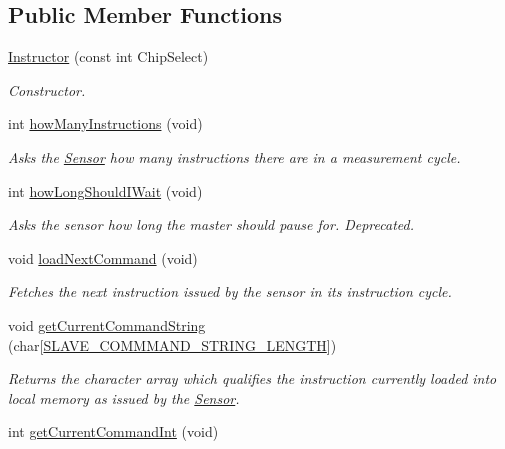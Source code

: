 \subsection*{Public Member Functions}
\begin{DoxyCompactItemize}
\item 
\mbox{\hyperlink{class_instructor_afd38d621d3d07ecb0e9c7f522a1b1823}{Instructor}} (const int Chip\+Select)
\begin{DoxyCompactList}\small\item\em Constructor. \end{DoxyCompactList}\item 
int \mbox{\hyperlink{class_instructor_abfe73e27d6364bf5cad80f30f6833ec8}{how\+Many\+Instructions}} (void)
\begin{DoxyCompactList}\small\item\em Asks the \mbox{\hyperlink{class_sensor}{Sensor}} how many instructions there are in a measurement cycle. \end{DoxyCompactList}\item 
int \mbox{\hyperlink{class_instructor_a2e9afbb8e6ce1c671e8e9dc29cf4715f}{how\+Long\+Should\+I\+Wait}} (void)
\begin{DoxyCompactList}\small\item\em Asks the sensor how long the master should pause for. Deprecated. \end{DoxyCompactList}\item 
void \mbox{\hyperlink{class_instructor_a43cbe18547a30108219f3aa2945fc9ca}{load\+Next\+Command}} (void)
\begin{DoxyCompactList}\small\item\em Fetches the next instruction issued by the sensor in its instruction cycle. \end{DoxyCompactList}\item 
void \mbox{\hyperlink{class_instructor_a8c66f480a7b5a6b434f613bc7197e824}{get\+Current\+Command\+String}} (char\mbox{[}\mbox{\hyperlink{_s_p_i___instruction_set_8h_afb2f23f8980c03317ec47ce151335ec7}{S\+L\+A\+V\+E\+\_\+\+C\+O\+M\+M\+M\+A\+N\+D\+\_\+\+S\+T\+R\+I\+N\+G\+\_\+\+L\+E\+N\+G\+TH}}\mbox{]})
\begin{DoxyCompactList}\small\item\em Returns the character array which qualifies the instruction currently loaded into local memory as issued by the \mbox{\hyperlink{class_sensor}{Sensor}}. \end{DoxyCompactList}\item 
int \mbox{\hyperlink{class_instructor_adcbf1cb6d2739539465edc6d996d2987}{get\+Current\+Command\+Int}} (void)

\end{DoxyCompactItemize}
